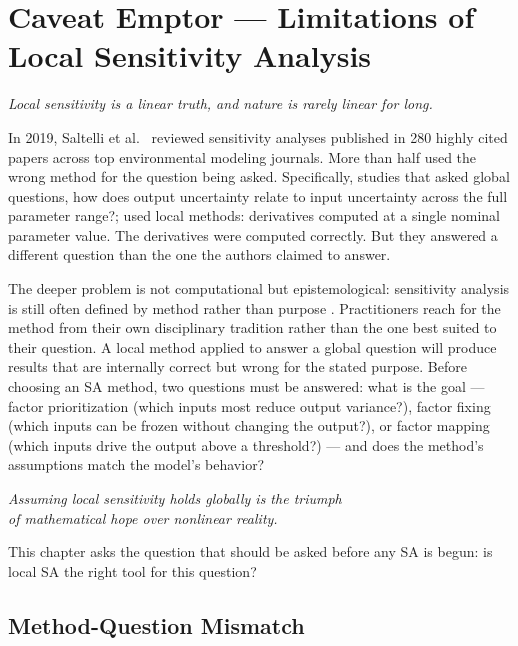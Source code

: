 \chapter{Caveat Emptor --- Limitations of Local Sensitivity Analysis}

\begin{flushright}
\textit{Local sensitivity is a linear truth, and nature is rarely linear for long.}
\end{flushright}

\bigskip

In 2019, Saltelli et al.~\cite{saltelli2019why} reviewed sensitivity analyses
published in 280 highly cited papers across top environmental modeling journals.
More than half used the wrong method for the question being asked.
Specifically, studies that asked global questions, how does output
uncertainty relate to input uncertainty across the full parameter range?;
used local methods: derivatives computed at a single nominal parameter value.
The derivatives were computed correctly. But they answered a different question
than the one the authors claimed to answer.

The deeper problem is not computational but epistemological: sensitivity
analysis is still often defined by method rather than purpose
\cite{razavi2021future}.
Practitioners reach for the method from their own disciplinary tradition
rather than the one best suited to their question.
A local method applied to answer a global question will produce results
that are internally correct but wrong for the stated purpose.
Before choosing an SA method, two questions must be answered: what is the
goal --- factor prioritization (which inputs most reduce output variance?),
factor fixing (which inputs can be frozen without changing the output?),
or factor mapping (which inputs drive the output above a threshold?) ---
and does the method's assumptions match the model's behavior?

\medskip
\begin{center}
\textit{Assuming local sensitivity holds globally is the triumph\\
of mathematical hope over nonlinear reality.}
\end{center}
\medskip

This chapter asks the question that should be asked before any SA is begun:
is local SA the right tool for this question?

\section{Method-Question Mismatch}
\label{sec:mismatch}

